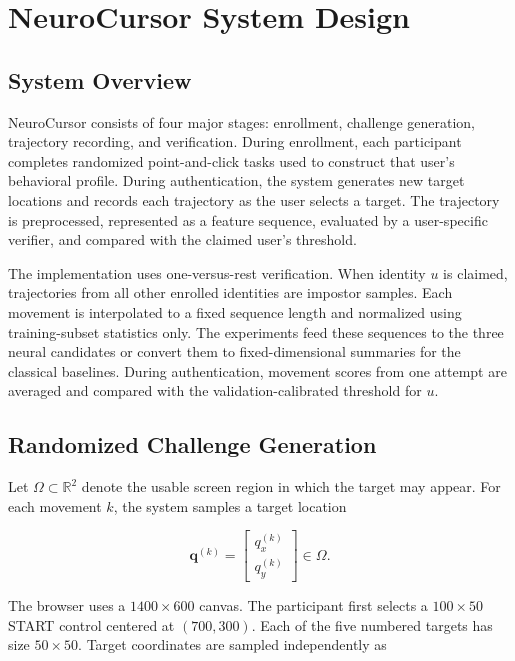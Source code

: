 \documentclass[conference]{IEEEtran}
\begin{document}
\section{NeuroCursor System Design}

\subsection{System Overview}
NeuroCursor consists of four major stages: enrollment, challenge generation,
trajectory recording, and verification. During enrollment, each participant
completes randomized point-and-click tasks used to construct that user's
behavioral profile. During authentication, the system generates new target
locations and records each trajectory as the user selects a target. The
trajectory is preprocessed, represented as a feature sequence, evaluated by a
user-specific verifier, and compared with the claimed user's threshold.

The implementation uses one-versus-rest verification. When identity $u$ is
claimed, trajectories from all other enrolled identities are impostor samples.
Each movement is interpolated to a fixed sequence length and normalized using
training-subset statistics only. The experiments feed these sequences to the
three neural candidates or convert them to fixed-dimensional summaries for the
classical baselines. During authentication, movement scores from one attempt
are averaged and compared with the validation-calibrated threshold for $u$.

\subsection{Randomized Challenge Generation}

Let $\Omega \subset \mathbb{R}^2$ denote the usable screen region in which the target may appear. For each movement $k$, the system samples a target location

\begin{equation}
\mathbf{q}^{(k)}
=
\begin{bmatrix}
q_x^{(k)}\\
q_y^{(k)}
\end{bmatrix}
\in \Omega.
\label{eq:target_location}
\end{equation}

The browser uses a $1400\times600$ canvas. The participant first selects a
$100\times50$ START control centered at $(700,300)$. Each of the five numbered
targets has size $50\times50$. Target coordinates are sampled independently as
\end{document}
